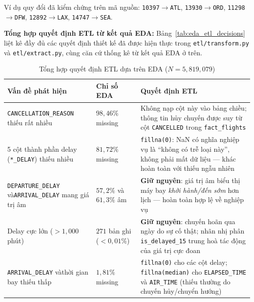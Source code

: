 \noindent
Ví dụ quy đổi đã kiểm chứng trên mã nguồn:
\texttt{10397}$\rightarrow$\texttt{ATL},
\texttt{13930}$\rightarrow$\texttt{ORD},
\texttt{11298}$\rightarrow$\texttt{DFW},
\texttt{12892}$\rightarrow$\texttt{LAX},
\texttt{14747}$\rightarrow$\texttt{SEA}.

\noindent \textbf{Tổng hợp quyết định ETL từ kết quả EDA:} Bảng~\ref{tab:eda_etl_decisions} liệt kê đầy đủ các quyết định thiết kế đã được
hiện thực trong \texttt{etl/transform.py} và \texttt{etl/extract.py},
cùng căn cứ thống kê từ kết quả EDA ở trên.

\begin{table}[H]
\centering
\caption{Tổng hợp quyết định ETL dựa trên EDA ($N = 5{,}819{,}079$)}
\vspace{4pt}
\small
\setlength{\tabcolsep}{4pt}
\renewcommand{\arraystretch}{1.25}
\begin{tabular}{|p{3.8cm}|p{3.2cm}|p{7.2cm}|}
\hline
\textbf{Vấn đề phát hiện} & \textbf{Chỉ số EDA} & \textbf{Quyết định ETL} \\ \hline

\texttt{CANCELLATION\_REASON} thiếu rất nhiều
  & $98{,}46\%$ missing
  & Không nạp cột này vào bảng chiều; thông tin hủy chuyến được suy từ
    cột \texttt{CANCELLED} trong \texttt{fact\_flights} \\ \hline

5 cột thành phần delay\newline
(\texttt{*\_DELAY}) thiếu nhiều
  & $81{,}72\%$ missing
  & \texttt{fillna(0)}: NaN có nghĩa nghiệp vụ là ``không có trễ loại này'',
    không phải mất dữ liệu --- khác hoàn toàn với thiếu ngẫu nhiên \\ \hline

\texttt{DEPARTURE\_DELAY} và\newline \texttt{ARRIVAL\_DELAY} mang giá trị âm
  & $57{,}2\%$ và $61{,}3\%$ âm
  & \textbf{Giữ nguyên}: giá trị âm biểu thị máy bay \textit{khởi hành/đến sớm}
    hơn lịch --- hoàn toàn hợp lệ về nghiệp vụ \\ \hline

Delay cực lớn ($>1{,}000$ phút)
  & $271$ bản ghi ($< 0{,}01\%$)
  & \textbf{Giữ nguyên}: chuyến hoãn qua ngày do sự cố thật;
    nhãn nhị phân \texttt{is\_delayed\_15} trung hoà tác động của giá trị cực đoan \\ \hline

\texttt{ARRIVAL\_DELAY} và\newline thời gian bay thiếu thấp
  & $1{,}81\%$ missing
  & \texttt{fillna(0)} cho các cột delay; \texttt{fillna(median)} cho
    \texttt{ELAPSED\_TIME} và \texttt{AIR\_TIME}
    (thiếu thường do chuyến hủy/chuyển hướng) \\ \hline


\end{tabular}
\end{table}
